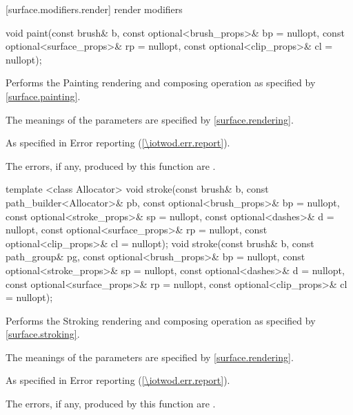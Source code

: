 [surface.modifiers.render] { render modifiers}

\begin{itemdecl}
void paint(const brush& b, const optional<brush_props>& bp = nullopt,
  const optional<surface_props>& rp = nullopt,
  const optional<clip_props>& cl = nullopt);
\end{itemdecl}
\begin{itemdescr}
\pnum
\effects
Performs the Painting rendering and composing operation as specified by \ref{surface.painting}.

\pnum
The meanings of the parameters are specified by \ref{surface.rendering}.

\pnum
\throws
As specified in Error reporting (\ref{\iotwod.err.report}).

\pnum
\errors
The errors, if any, produced by this function are .
\end{itemdescr}

\begin{itemdecl}
template <class Allocator>
void stroke(const brush& b, const path_builder<Allocator>& pb,
  const optional<brush_props>& bp = nullopt,
  const optional<stroke_props>& sp = nullopt,
  const optional<dashes>& d = nullopt,
  const optional<surface_props>& rp = nullopt,
  const optional<clip_props>& cl = nullopt);
void stroke(const brush& b, const path_group& pg,
  const optional<brush_props>& bp = nullopt,
  const optional<stroke_props>& sp = nullopt,
  const optional<dashes>& d = nullopt,
  const optional<surface_props>& rp = nullopt,
  const optional<clip_props>& cl = nullopt);
\end{itemdecl}
\begin{itemdescr}
\pnum
\effects
Performs the Stroking rendering and composing operation as specified by \ref{surface.stroking}.

\pnum
The meanings of the parameters are specified by \ref{surface.rendering}.

\pnum
\throws
As specified in Error reporting (\ref{\iotwod.err.report}).

\pnum
\errors
The errors, if any, produced by this function are .
\end{itemdescr}

